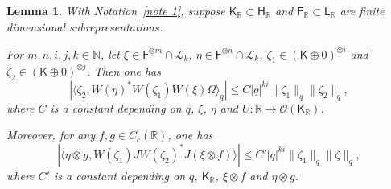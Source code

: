 \documentclass[a4paper,11pt]{amsart}
\newtheorem{lem}[thm]{Lemma}
\theoremstyle{definition}
\newcommand{\N}{{\mathbb N}}
\newcommand{\R}{{\mathbb R}}
\newcommand{\cL}{{\mathcal L}}
\newcommand{\cO}{{\mathcal O}}
\newcommand{\sH}{\mathsf{H}}
\newcommand{\sK}{\mathsf{K}}
\newcommand{\sL}{\mathsf{L}}
\newcommand{\sF}{\mathsf{F}}
\newcommand{\ot}{\otimes}
\begin{document}
\begin{lem}\label{lem: inequality for wk coarse}
With Notation~\ref{note 1},
	suppose $\sK_\R\subset \sH_\R$ and $\sF_\R\subset \sL_\R$ 
	are finite dimensional subrepresentations.

For $m, n, i, j, k\in \N$, let 
	$\xi\in \sF^{\otimes m}\cap \cL_k$, $\eta\in \sF^{\ot n}\cap \cL_k$, $\zeta_1\in (\sK\oplus 0)^{\otimes i}$ and $\zeta_2\in (\sK\oplus 0)^{\ot j}$.
Then one has 
\begin{equation}\label{eq: fin dim 1}
|\langle \zeta_2, W(\eta)^* W(\zeta_1) W(\xi)\Omega\rangle_q|\leq C |q|^{ki}\|\zeta_1\|_q\|\zeta_2\|_q,
\end{equation}
where $C$ is a constant depending on $q$, $\xi$, $\eta$ and $U:\R\to\cO(\sK_\R)$.

Moreover, for any $f,g\in C_c(\R)$, one has 
$$|\langle \eta\ot g, W(\zeta_1) JW(\zeta_2)^*J (\xi\ot f)\rangle|\leq C' |q|^{ki}\|\zeta_1\|_q\|\zeta\|_q,$$
where $C'$ is a constant depending on $q$, $\sK_\R$, $\xi\ot f$ and $\eta\ot g$.
\end{lem}
\end{document}
